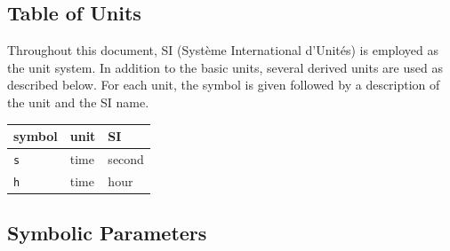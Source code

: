 \documentclass[12pt]{article}
\begin{document}
\subsection{Table of Units}

Throughout this document, SI (Syst\`{e}me International d'Unit\'{e}s) is employed
as the unit system.  In addition to the basic units, several derived units are
used as described below.  For each unit, the symbol is given followed by a
description of the unit and the SI name.

\begin{center}
    \begin{tabular}{ |l|l|l|  }
    
    \hline
    symbol & unit & SI \\
    \hline
    \texttt{s} & time & second\\
    \hline
    \texttt{h} & time & hour\\
    \hline
    \end{tabular}
    \end{center}

\subsection{Symbolic Parameters}
\end{document}
